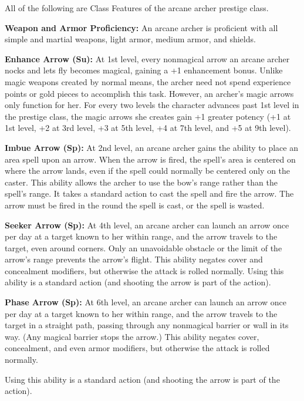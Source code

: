 \ClassFeatures

All of the following are Class Features of the arcane archer prestige class.

\textbf{Weapon and Armor Proficiency:} An arcane archer is proficient with all 
simple and martial weapons, light armor, medium armor, and shields.

\textbf{Enhance Arrow (Su):} At 1st level, every nonmagical arrow an arcane archer 
nocks and lets fly becomes magical, gaining a +1 enhancement bonus. Unlike magic 
weapons created by normal means, the archer need not spend experience points or 
gold pieces to accomplish this task. However, an archer's magic arrows only function 
for her. For every two levels the character advances past 1st level in the prestige 
class, the magic arrows she creates gain +1 greater potency (+1 at 1st level, +2 
at 3rd level, +3 at 5th level, +4 at 7th level, and +5 at 9th level).

\textbf{Imbue Arrow (Sp):} At 2nd level, an arcane archer gains 
the ability to place an area spell upon an arrow. When the arrow is fired, the 
spell's area is centered on where the arrow lands, even if the spell could normally 
be centered only on the caster. This ability allows the archer to use the bow's 
range rather than the spell's range. It takes a standard action to cast the spell 
and fire the arrow. The arrow must be fired in the round the spell is cast, or 
the spell is wasted.

\textbf{Seeker Arrow (Sp):} At 4th level, an arcane archer can 
launch an arrow once per day at a target known to her within range, and the arrow 
travels to the target, even around corners. Only an unavoidable obstacle or the 
limit of the arrow's range prevents the arrow's flight. This ability negates cover 
and concealment modifiers, but otherwise the attack is rolled normally. Using this 
ability is a standard action (and shooting the arrow is part of the action).

\textbf{Phase Arrow (Sp):} At 6th level, an arcane archer can 
launch an arrow once per day at a target known to her within range, and the arrow 
travels to the target in a straight path, passing through any nonmagical barrier 
or wall in its way. (Any magical barrier stops the arrow.) This ability negates 
cover, concealment, and even armor modifiers, but otherwise the attack is rolled 
normally.

Using this ability is a standard action (and shooting the arrow is part of the 
action).

